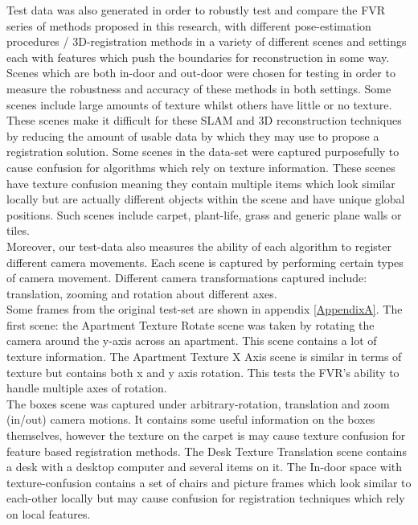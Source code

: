 Test data was also generated in order to robustly test and compare the FVR series of methods proposed in this research, with different pose-estimation procedures / 3D-registration methods in a variety of different scenes and settings each with features which push the boundaries for reconstruction in some way. Scenes which are both in-door and out-door were chosen for testing in order to measure the robustness and accuracy of these methods in both settings. Some scenes include large amounts of texture whilst others have little or no texture. These scenes make it difficult for these SLAM and 3D reconstruction techniques by reducing the amount of usable data by which they may use to propose a registration solution. Some scenes in the data-set were captured purposefully to cause confusion for algorithms which rely on texture information. These scenes have texture confusion meaning they contain multiple items which look similar locally but are actually different objects within the scene and have unique global positions. Such scenes include carpet, plant-life, grass and generic plane walls or tiles. \\

Moreover, our test-data also measures the ability of each algorithm to register different camera movements. Each scene is captured by performing certain types of camera movement. Different camera transformations captured include: translation, zooming and rotation about different axes. \\

Some frames from the original test-set are shown in appendix \ref{AppendixA}. The first scene: the Apartment Texture Rotate scene was taken by rotating the camera around the y-axis across an apartment. This scene contains a lot of texture information. The Apartment Texture X Axis scene is similar in terms of texture but contains both x and y axis rotation. This tests the FVR's ability to handle multiple axes of rotation. \\

The boxes scene was captured under arbitrary-rotation, translation and zoom (in/out) camera motions. It contains some useful information on the boxes themselves, however the texture on the carpet is may cause texture confusion for feature based registration methods. The Desk Texture Translation scene contains a desk with a desktop computer and several items on it. The In-door space with texture-confusion contains a set of chairs and picture frames which look similar to each-other locally but may cause confusion for registration techniques which rely on local features.  \\

